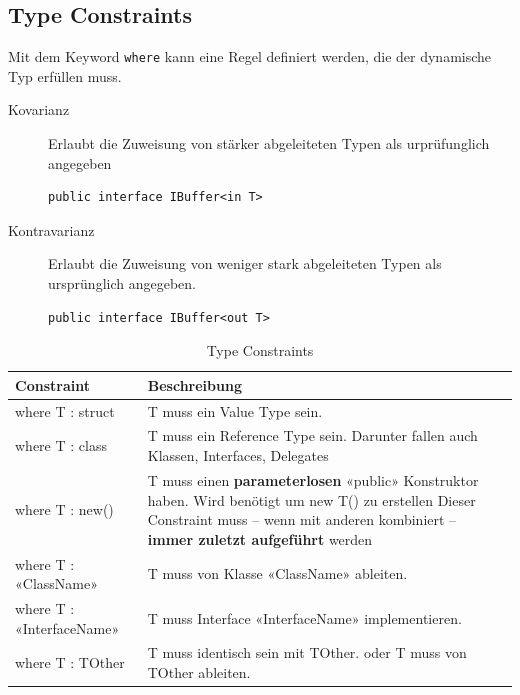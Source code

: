 \documentclass[
a4paper,
oneside,
10pt,
fleqn,
headsepline,
toc=listofnumbered, 
bibliography=totocnumbered]{scrartcl}
\begin{document}
\subsection{Type Constraints}
Mit dem Keyword \lstinline|where| kann eine Regel definiert werden, die der dynamische Typ erfüllen muss.

\begin{description}
	\item[Kovarianz] Erlaubt die Zuweisung von stärker abgeleiteten Typen als urprüfunglich angegeben
		\begin{lstlisting}
public interface IBuffer<in T>
\end{lstlisting}
	\item[Kontravarianz] Erlaubt die Zuweisung von weniger stark abgeleiteten Typen als ursprünglich angegeben.
		\begin{lstlisting}
public interface IBuffer<out T>
\end{lstlisting}
\end{description}

\begin{table}[ht]
	\centering
	\begin{tabu} to \linewidth {l X}
		\toprule
		Constraint                & Beschreibung                                                                                           \\
		\midrule
		where T : struct          & T muss ein Value Type sein.                                                                            \\
		where T : class           & T muss ein Reference Type sein. Darunter fallen auch Klassen, Interfaces, Delegates                    \\
		where T : new()           & T muss einen \textbf{parameterlosen} «public» Konstruktor haben. Wird benötigt um new T() zu erstellen
		Dieser Constraint muss – wenn mit anderen kombiniert – \textbf{immer zuletzt
		aufgeführt} werden                                                                                                                 \\
		where T : «ClassName»     & T muss von Klasse «ClassName» ableiten.                                                                \\
		where T : «InterfaceName» & T muss Interface «InterfaceName» implementieren.                                                       \\
		where T : TOther          & T muss identisch sein mit TOther.
		oder
		T muss von TOther ableiten.                                                                                                        \\
		\bottomrule
	\end{tabu}
	\caption{Type Constraints}
\end{table}
\end{document}
